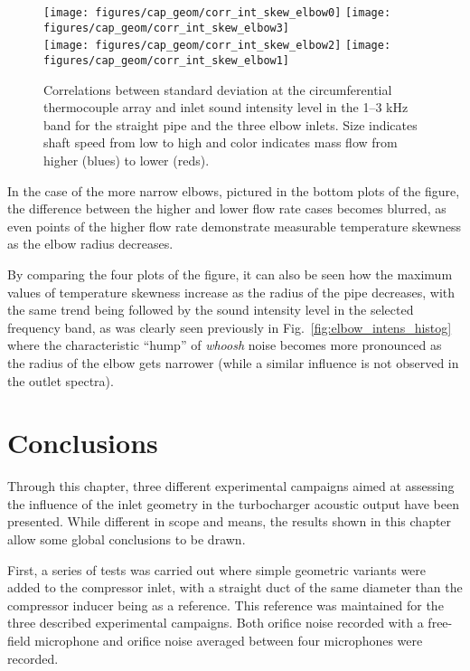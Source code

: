 \begin{figure}[t!]
\centering
\texttt{[image: figures/cap\_geom/corr\_int\_skew\_elbow0]}\hspace{4mm}
\texttt{[image: figures/cap\_geom/corr\_int\_skew\_elbow3]}\\[4mm]
\texttt{[image: figures/cap\_geom/corr\_int\_skew\_elbow2]}\hspace{4mm}
\texttt{[image: figures/cap\_geom/corr\_int\_skew\_elbow1]}
\caption{Correlations between standard deviation at the circumferential thermocouple array and inlet sound intensity level in the 1--3 kHz band for the straight pipe and the three elbow inlets. Size indicates shaft speed from low to high and color indicates mass flow from higher (blues) to lower (reds).}
\label{fig:comp_corrs_skew_sil}
\end{figure}

In the case of the more narrow elbows, pictured in the bottom plots of the figure, the difference between the higher and lower flow rate cases becomes blurred, as even points of the higher flow rate demonstrate measurable temperature skewness as the elbow radius decreases. 

By comparing the four plots of the figure, it can also be seen how the maximum values of temperature skewness increase as the radius of the pipe decreases, with the same trend being followed by the sound intensity level in the selected frequency band, as was clearly seen previously in Fig.~\ref{fig:elbow_intens_histog} where the characteristic ``hump'' of \emph{whoosh} noise becomes more pronounced as the radius of the elbow gets narrower (while a similar influence is not observed in the outlet spectra).

\section{Conclusions}

Through this chapter, three different experimental campaigns aimed at assessing the influence of the inlet geometry in the turbocharger acoustic output have been presented. While different in scope and means, the results shown in this chapter allow some global conclusions to be drawn.

First, a series of tests was carried out where simple geometric variants were added to the compressor inlet, with a straight duct of the same diameter than the compressor inducer being as a reference. This reference was maintained for the three described experimental campaigns. Both orifice noise recorded with a free-field microphone and orifice noise averaged between four microphones were recorded.

